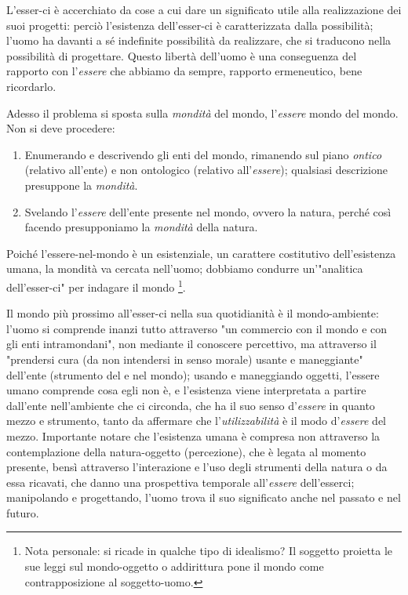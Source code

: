\documentclass[a4paper,12pt,oneside]{article}%
\begin{document}
L’esser-ci è accerchiato da cose a cui dare un significato utile alla realizzazione dei suoi progetti: perciò l’esistenza dell’esser-ci è caratterizzata dalla possibilità; l’uomo ha davanti a sé indefinite possibilità da realizzare, che si traducono nella possibilità di progettare. Questo libertà dell'uomo è una conseguenza del rapporto con l'\textit{essere} che abbiamo da sempre, rapporto ermeneutico, bene ricordarlo.

Adesso il problema si sposta sulla \textit{mondità} del mondo, l'\textit{essere} mondo del mondo. Non si deve procedere:

\begin{enumerate}
	\item Enumerando e descrivendo gli enti del mondo, rimanendo sul piano \textit{ontico} (relativo all'ente) e non ontologico (relativo all'\textit{essere}); qualsiasi descrizione presuppone la \textit{mondità}.
	\item Svelando l'\textit{essere} dell'ente presente nel mondo, ovvero la natura, perché così facendo presupponiamo la \textit{mondità} della natura.
\end{enumerate}

Poiché l'essere-nel-mondo è un esistenziale, un carattere costitutivo dell'esistenza umana, la mondità va cercata nell'uomo; dobbiamo condurre un'"analitica dell'esser-ci" per indagare il mondo \footnote{Nota personale: si ricade in qualche tipo di idealismo? Il soggetto proietta le sue leggi sul mondo-oggetto o addirittura pone il mondo come contrapposizione al soggetto-uomo.}.
	
Il mondo più prossimo all'esser-ci nella sua quotidianità è il mondo-ambiente: l'uomo si comprende inanzi tutto attraverso "un commercio con il mondo e con gli enti intramondani", non mediante il conoscere percettivo, ma attraverso il "prendersi cura (da non intendersi in senso morale) usante e maneggiante" dell'ente (strumento del e nel mondo); usando e maneggiando oggetti, l'essere umano comprende cosa egli non è, e l'esistenza viene interpretata a partire dall'ente nell'ambiente che ci circonda, che ha il suo senso d'\textit{essere} in quanto mezzo e strumento, tanto da affermare che l'\textit{utilizzabilità} è il modo d'\textit{essere} del mezzo. Importante notare che l'esistenza umana è compresa non attraverso la contemplazione della natura-oggetto (percezione), che è legata al momento presente, bensì attraverso l'interazione e l'uso degli strumenti della natura o da essa ricavati, che danno una prospettiva temporale all'\textit{essere} dell'esserci; manipolando e progettando, l'uomo trova il suo significato anche nel passato e nel futuro.
\end{document}
